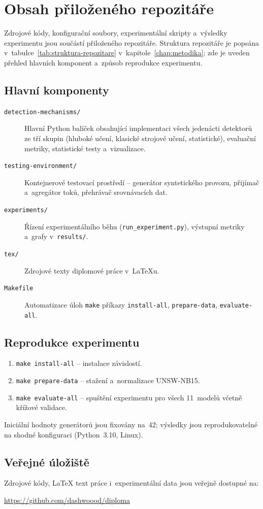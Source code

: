 \chapter{Obsah přiloženého repozitáře}
\label{app:repository}

Zdrojové kódy, konfigurační soubory, experimentální skripty a~výsledky experimentu jsou součástí přiloženého repozitáře. Struktura repozitáře je popsána v~tabulce~\ref{tab:struktura-repozitare} v~kapitole~\ref{chap:metodika}; zde je uveden přehled hlavních komponent a~způsob reprodukce experimentu.

\section*{Hlavní komponenty}

\begin{description}
\item[\texttt{detection-mechanisms/}] Hlavní Python balíček obsahující implementaci všech jedenácti detektorů ze tří skupin (hluboké učení, klasické strojové učení, statistické), evaluační metriky, statistické testy a~vizualizace.
\item[\texttt{testing-environment/}] Kontejnerové testovací prostředí -- generátor syntetického provozu, přijímač a~agregátor toků, přehrávač srovnávacích dat.
\item[\texttt{experiments/}] Řízení experimentálního běhu (\texttt{run\_experiment.py}), výstupní metriky a~grafy v~\texttt{results/}.
\item[\texttt{tex/}] Zdrojové texty diplomové práce v~\LaTeX{u}.
\item[\texttt{Makefile}] Automatizace úloh \texttt{make} příkazy \texttt{install-all}, \texttt{prepare-data}, \texttt{evaluate-all}.
\end{description}

\section*{Reprodukce experimentu}

\begin{enumerate}
\item \texttt{make install-all} -- instalace závislostí.
\item \texttt{make prepare-data} -- stažení a~normalizace UNSW-NB15.
\item \texttt{make evaluate-all} -- spuštění experimentu pro všech 11~modelů včetně křížové validace.
\end{enumerate}

Iniciální hodnoty generátorů jsou fixovány na~42; výsledky jsou reprodukovatelné na shodné konfiguraci (Python~3.10, Linux).

\section*{Veřejné úložiště}

Zdrojové kódy, \LaTeX{} text práce i~experimentální data jsou veřejně dostupné na:
\begin{center}
\url{https://github.com/dashwoood/diploma}
\end{center}
